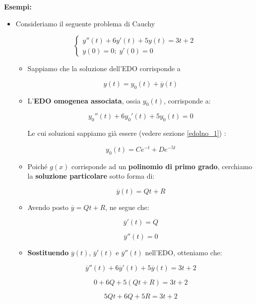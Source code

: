 \documentclass[a4paper, 12pt]{report}
\begin{document}
    \textbf{Esempi:}
    \begin{itemize}
        \item Consideriamo il seguente problema di Cauchy
        
        $$ 
        \left \{ \begin{array}{l}
            y''(t)+6y'(t)+5y(t)=3t+2 \\
            y(0) = 0; \; y'(0) = 0
        \end{array}\right .
        $$
        
        \begin{itemize}
            \item Sappiamo che la soluzione dell'EDO corrisponde a
            
            \[ y(t) = y_0(t) + \overline{y}(t)\]
            
            \item  L'\textbf{EDO omogenea associata}, ossia $y_0(t)$, corrisponde a:
            
            \[y_0''(t)+6y_0'(t)+5y_0(t)=0 \]
            
            Le cui soluzioni sappiamo già essere (vedere sezione \ref{edolno_1}) :
            
            \[y_0(t) = Ce^{-t}+De^{-5t} \]
            
            \item Poiché $g(x)$ corrisponde ad un \textbf{polinomio di primo grado}, cerchiamo la \textbf{soluzione particolare} sotto forma di:
            
            \[ \overline{y}(t) = Qt+R\]
            
            \item Avendo posto $\overline{y} = Qt + R$, ne segue che:
            
            \[ \overline{y}'(t) = Q\]
            
            \[ \overline{y}''(t) = 0\]
            
            \item \textbf{Sostituendo} $\overline{y}(t)$, $\overline{y}'(t)$ e $\overline{y}''(t)$ nell'EDO, otteniamo che:
            
            \[ \overline{y}''(t)+6\overline{y}'(t)+5\overline{y}(t) = 3t+2\]
            
            \[ 0 + 6Q + 5(Qt+R) = 3t+2\]
            
            \[  5Qt + 6Q + 5R = 3t +2\]
            

\end{itemize}
\end{itemize}
\end{document}
